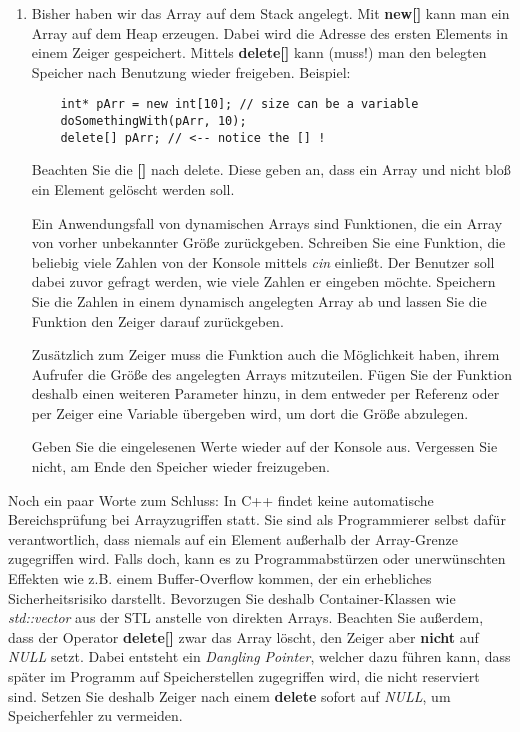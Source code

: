 \documentclass[
  accentcolor=tud1c,	%
  colorbacktitle,		%
  inverttitle,			%
  german,				%
  twoside
]{tudexercise}
\begin{document}
\begin{enumerate}
\item Bisher haben wir das Array auf dem Stack angelegt. Mit \textbf{new[]} kann man ein Array auf dem Heap erzeugen. Dabei wird die Adresse des ersten Elements in einem Zeiger gespeichert. Mittels \textbf{delete[]} kann (muss!) man den belegten Speicher nach Benutzung wieder freigeben. Beispiel:
\begin{lstlisting}
	int* pArr = new int[10]; // size can be a variable
	doSomethingWith(pArr, 10);
	delete[] pArr; // <-- notice the [] !
\end{lstlisting}
Beachten Sie die \textbf{[]} nach delete. Diese geben an, dass ein Array und nicht bloß ein Element gelöscht werden soll.

Ein Anwendungsfall von dynamischen Arrays sind Funktionen, die ein Array von vorher unbekannter Größe zurückgeben. Schreiben Sie eine Funktion, die beliebig viele Zahlen von der Konsole mittels \emph{cin} einließt. Der Benutzer soll dabei zuvor gefragt werden, wie viele Zahlen er eingeben möchte. Speichern Sie die Zahlen in einem dynamisch angelegten Array ab und lassen Sie die Funktion den Zeiger darauf zurückgeben. 

Zusätzlich zum Zeiger muss die Funktion auch die Möglichkeit haben, ihrem Aufrufer die Größe des angelegten Arrays mitzuteilen. Fügen Sie der Funktion deshalb einen weiteren Parameter hinzu, in dem entweder per Referenz oder per Zeiger eine Variable übergeben wird, um dort die Größe abzulegen. 

Geben Sie die eingelesenen Werte wieder auf der Konsole aus.
Vergessen Sie nicht, am Ende den Speicher wieder freizugeben.
\end{enumerate}

Noch ein paar Worte zum Schluss: In C++ findet keine automatische Bereichsprüfung bei Arrayzugriffen statt. Sie sind als Programmierer selbst dafür verantwortlich, dass niemals auf ein Element außerhalb der Array-Grenze zugegriffen wird. Falls doch, kann es zu Programmabstürzen oder unerwünschten Effekten wie z.B. einem Buffer-Overflow kommen, der ein erhebliches Sicherheitsrisiko darstellt. Bevorzugen Sie deshalb Container-Klassen wie \emph{std::vector} aus der STL anstelle von direkten Arrays. Beachten Sie außerdem, dass der Operator \textbf{delete[]} zwar das Array löscht, den Zeiger aber \textbf{nicht} auf \emph{NULL} setzt. Dabei entsteht ein \emph{Dangling Pointer}, welcher dazu führen kann, dass später im Programm auf Speicherstellen zugegriffen wird, die nicht reserviert sind. Setzen Sie deshalb Zeiger nach einem \textbf{delete} sofort auf \emph{NULL}, um Speicherfehler zu vermeiden. \\
\end{document}
